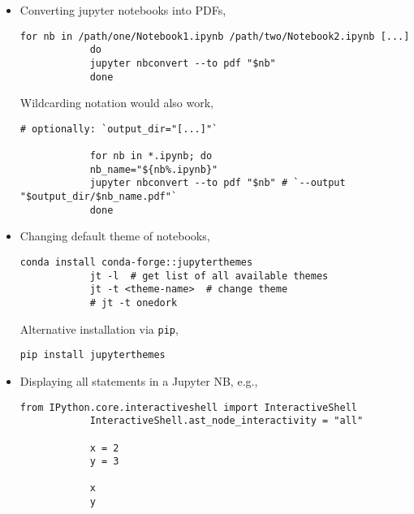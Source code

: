 \documentclass[12pt, a4paper]{scrbook}
\numberwithin{equation}{section}
\theoremstyle{definition}
\theoremstyle{definition}
\begin{document}
	\begin{itemize}
		\item Converting jupyter notebooks into PDFs,
		
		\begin{lstlisting}[style=mystylepython, label=alg:notebooks_to_pdf, xleftmargin=\parindent]
			for nb in /path/one/Notebook1.ipynb /path/two/Notebook2.ipynb [...]
			do
			jupyter nbconvert --to pdf "$nb"
			done 
		\end{lstlisting}
		
		Wildcarding notation would also work, 
		
		\begin{lstlisting}[style=mystylepython, label=alg:notebooks_to_pdf__wildcard, xleftmargin=\parindent]
			# optionally: `output_dir="[...]"`
			
			for nb in *.ipynb; do
			nb_name="${nb%.ipynb}"
			jupyter nbconvert --to pdf "$nb" # `--output "$output_dir/$nb_name.pdf"`
			done 
		\end{lstlisting}
		
		\item Changing default theme of notebooks,
		
		\begin{lstlisting}[style=mystylebash, label=alg:jupyter_nbs_theme, xleftmargin=\parindent]
			conda install conda-forge::jupyterthemes
			jt -l  # get list of all available themes
			jt -t <theme-name>  # change theme
			# jt -t onedork
		\end{lstlisting}
	
		Alternative installation via \texttt{pip},
		
		\begin{lstlisting}[style=mystylebash, label=alg:jupyter_nbs_theme_pip, xleftmargin=\parindent]
			pip install jupyterthemes
		\end{lstlisting}
	
		\item Displaying all statements in a Jupyter NB, e.g.,
		
		\begin{lstlisting}[style=mystylebash, label=alg:jupyter_nbs_out, xleftmargin=\parindent]
			from IPython.core.interactiveshell import InteractiveShell
			InteractiveShell.ast_node_interactivity = "all"
			
			x = 2
			y = 3
			
			x
			y
		\end{lstlisting}
		
	\end{itemize}
	
\end{document}
